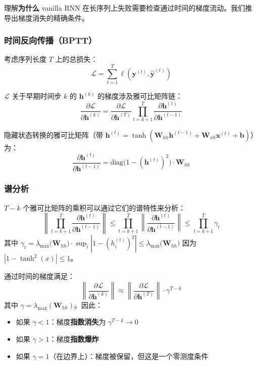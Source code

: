 理解\textbf{为什么} vanilla RNN 在长序列上失败需要检查通过时间的梯度流动。我们推导出梯度消失的精确条件。

\subsubsection{时间反向传播（BPTT）}

考虑序列长度 $T$ 上的总损失：
\begin{equation}
\mathcal{L} = \sum_{t=1}^{T} \ell(\mathbf{y}^{(t)}, \hat{\mathbf{y}}^{(t)})
\end{equation}

$\mathcal{L}$ 关于早期时间步 $k$ 的 $\mathbf{h}^{(k)}$ 的梯度涉及雅可比矩阵链：
\begin{equation}
\frac{\partial \mathcal{L}}{\partial \mathbf{h}^{(k)}} = \frac{\partial \mathcal{L}}{\partial \mathbf{h}^{(T)}} \prod_{t=k+1}^{T} \frac{\partial \mathbf{h}^{(t)}}{\partial \mathbf{h}^{(t-1)}}
\end{equation}

隐藏状态转换的雅可比矩阵（带 $\mathbf{h}^{(t)} = \tanh(\mathbf{W}_{hh}\mathbf{h}^{(t-1)} + \mathbf{W}_{xh}\mathbf{x}^{(t)} + \mathbf{b})$）为：
\begin{equation}
\frac{\partial \mathbf{h}^{(t)}}{\partial \mathbf{h}^{(t-1)}} = \text{diag}\bigl(1 - (\mathbf{h}^{(t)})^2\bigr) \cdot \mathbf{W}_{hh}
\end{equation}

\subsubsection{谱分析}

$T - k$ 个雅可比矩阵的乘积可以通过它们的谱特性来分析：
\begin{equation}
\left\| \prod_{t=k+1}^{T} \frac{\partial \mathbf{h}^{(t)}}{\partial \mathbf{h}^{(t-1)}} \right\| \leq \prod_{t=k+1}^{T} \left\| \frac{\partial \mathbf{h}^{(t)}}{\partial \mathbf{h}^{(t-1)}} \right\| \leq \prod_{t=k+1}^{T} \gamma_t
\end{equation}
其中 $\gamma_t = \lambda_{\max}\bigl(\mathbf{W}_{hh}\bigr) \cdot \sup_i |1 - (h_i^{(t)})^2| \leq \lambda_{\max}\bigl(\mathbf{W}_{hh}\bigr)$ 因为 $|1 - \tanh^2(x)| \leq 1$。

\begin{定理}
通过时间的梯度满足：
\begin{equation}
\left\| \frac{\partial \mathcal{L}}{\partial \mathbf{h}^{(k)}} \right\| \approx \left\| \frac{\partial \mathcal{L}}{\partial \mathbf{h}^{(T)}} \right\| \cdot \gamma^{T-k}
\end{equation}
其中 $\gamma = \lambda_{\max}(\mathbf{W}_{hh})$。因此：
\begin{itemize}
    \item 如果 $\gamma < 1$：梯度\textbf{指数消失}为 $\gamma^{T-k} \to 0$
    \item 如果 $\gamma > 1$：梯度\textbf{指数爆炸}
    \item 如果 $\gamma = 1$（在边界上）：梯度被保留，但这是一个零测度条件
\end{itemize}
\end{定理}

